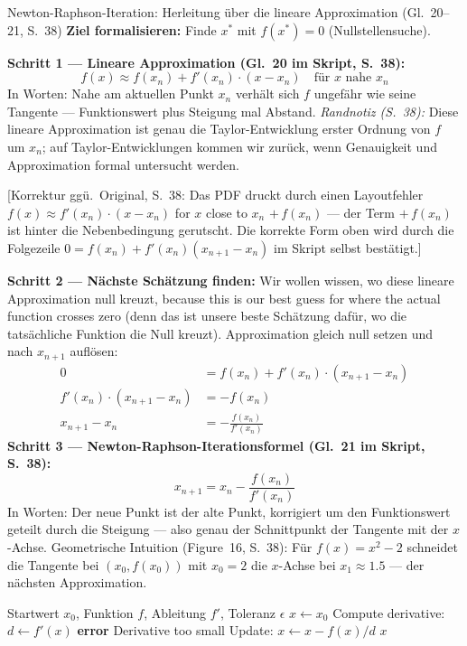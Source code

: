 \begin{satzbox}{Newton-Raphson-Iteration: Herleitung über die lineare Approximation (Gl.~20--21, S.~38)}
\textbf{Ziel formalisieren:} Finde $x^*$ mit $f(x^*) = 0$ (Nullstellensuche).

\textbf{Schritt 1 — Lineare Approximation (Gl.~20 im Skript, S.~38):}
\[ f(x) \approx f(x_n) + f'(x_n)\cdot(x - x_n) \quad \text{für } x \text{ nahe } x_n \tag{Gl.~20} \]
In Worten: Nahe am aktuellen Punkt $x_n$ verhält sich $f$ ungefähr wie seine Tangente — Funktionswert plus Steigung mal Abstand. \emph{Randnotiz (S.~38):} Diese lineare Approximation ist genau die Taylor-Entwicklung erster Ordnung von $f$ um $x_n$; auf Taylor-Entwicklungen kommen wir zurück, wenn Genauigkeit und Approximation formal untersucht werden.

[Korrektur ggü.\ Original, S.~38: Das PDF druckt durch einen Layoutfehler \glqq$f(x) \approx f'(x_n)\cdot(x - x_n)$ for $x$ close to $x_n$ $+\,f(x_n)$\grqq{} — der Term $+\,f(x_n)$ ist hinter die Nebenbedingung gerutscht. Die korrekte Form oben wird durch die Folgezeile $0 = f(x_n) + f'(x_n)(x_{n+1} - x_n)$ im Skript selbst bestätigt.]

\textbf{Schritt 2 — Nächste Schätzung finden:} Wir wollen wissen, wo diese lineare Approximation null kreuzt, \glqq because this is our best guess for where the actual function crosses zero\grqq{} (denn das ist unsere beste Schätzung dafür, wo die tatsächliche Funktion die Null kreuzt). Approximation gleich null setzen und nach $x_{n+1}$ auflösen:
\begin{align*}
0 &= f(x_n) + f'(x_n)\cdot(x_{n+1} - x_n) \\
f'(x_n)\cdot(x_{n+1} - x_n) &= -f(x_n) \\
x_{n+1} - x_n &= -\frac{f(x_n)}{f'(x_n)}
\end{align*}
\textbf{Schritt 3 — Newton-Raphson-Iterationsformel (Gl.~21 im Skript, S.~38):}
\[ x_{n+1} = x_n - \frac{f(x_n)}{f'(x_n)} \tag{Gl.~21} \]
In Worten: Der neue Punkt ist der alte Punkt, korrigiert um den Funktionswert geteilt durch die Steigung — also genau der Schnittpunkt der Tangente mit der $x$-Achse. Geometrische Intuition (Figure~16, S.~38): Für $f(x) = x^2 - 2$ schneidet die Tangente bei $(x_0, f(x_0))$ mit $x_0 = 2$ die $x$-Achse bei $x_1 \approx 1.5$ — der nächsten Approximation.
\end{satzbox}

\begin{algorithm}[H]
\caption{Newton-Raphson Method (Algorithmus 1 im Skript, S.~38)}
\begin{algorithmic}[1]
\Require Startwert $x_0$, Funktion $f$, Ableitung $f'$, Toleranz $\epsilon$
\State $x \gets x_0$
  \State Compute derivative: $d \gets f'(x)$
    \State \textbf{error} \glqq Derivative too small\grqq
  \EndIf
  \State Update: $x \gets x - f(x)/d$
\EndWhile
\State \Return $x$
\end{algorithmic}
\end{algorithm}

